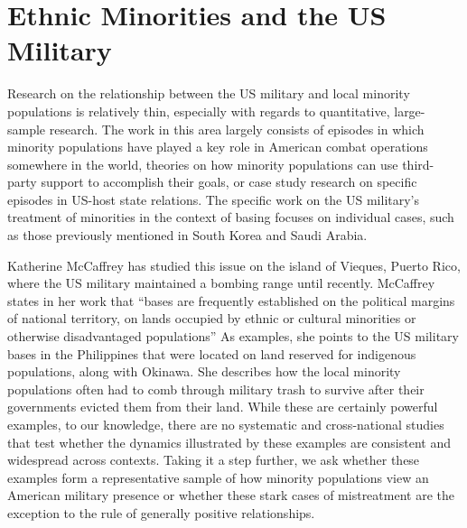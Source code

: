 



\section*{Ethnic Minorities and the US Military}

Research on the relationship between the US military and local minority populations is relatively thin, especially with regards to quantitative, large-sample research. The work in this area largely consists of episodes in which minority populations have played a key role in American combat operations somewhere in the world, theories on how minority populations can use third-party support to accomplish their goals, or case study research on specific episodes in US-host state relations. The specific work on the US military's treatment of minorities in the context of basing focuses on individual cases, such as those previously mentioned in South Korea and Saudi Arabia. 

Katherine McCaffrey has studied this issue on the island of Vieques, Puerto Rico, where the US military maintained a bombing range until recently.\cite{Mccaffrey2002} McCaffrey states in her work that ``bases are frequently established on the political margins of national territory, on lands occupied by ethnic or cultural minorities or otherwise disadvantaged populations''\cite[p 9-10]{Mccaffrey2002} As examples, she points to the US military bases in the Philippines that were located on land reserved for indigenous populations, along with Okinawa. She describes how the local minority populations often had to comb through military trash to survive after their governments evicted them from their land. While these are certainly powerful examples, to our knowledge, there are no systematic and cross-national studies that test whether the dynamics illustrated by these examples are consistent and widespread across contexts. Taking it a step further, we ask whether these examples form a representative sample of how minority populations view an American military presence or whether these stark cases of mistreatment are the exception to the rule of generally positive relationships. 

